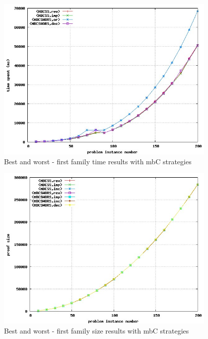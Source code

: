 \documentclass[a4paper,10pt]{book}
\newcommand{\mbc}{mbC}
\begin{document}
\begin{figure}[!htbp]
\begin{center}
\includegraphics[width=0.95\textwidth]{../mbc_1_c.jpg}
\end{center}
\caption{Best and worst - first family time results with \mbc\/ strategies}
\end{figure}


\begin{figure}[!htbp]
\begin{center}
\includegraphics[width=0.95\textwidth]{../mbc_1_d.jpg}
\end{center}
\caption{Best and worst - first family size results with \mbc\/ strategies}
\end{figure}
\end{document}
